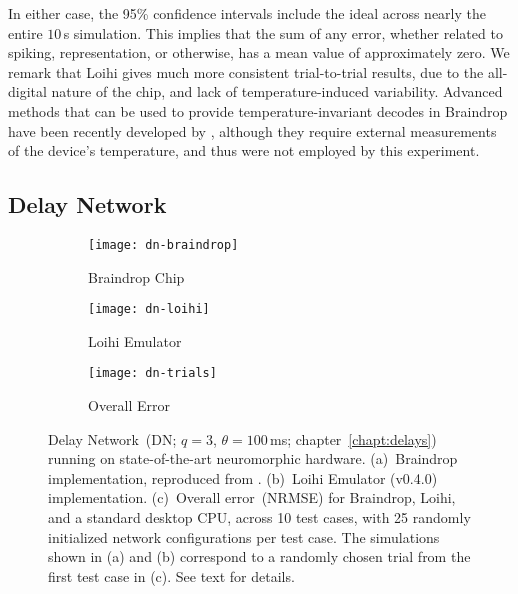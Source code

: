
In either case, the 95\% confidence intervals include the ideal across nearly the entire $10$\,s simulation.
This implies that the sum of any error, whether related to spiking, representation, or otherwise, has a mean value of approximately zero.
We remark that Loihi gives much more consistent trial-to-trial results, due to the all-digital nature of the chip, and lack of temperature-induced variability.
Advanced methods that can be used to provide temperature-invariant decodes in Braindrop have been recently developed by \citet{reidpint2019}, although they require external measurements of the device's temperature, and thus were not employed by this experiment.

\subsection{Delay Network}

\begin{figure}
  \centering
  \begin{subfigure}{.5\textwidth}
    \centering
    \texttt{[image: dn-braindrop]}
    \caption{Braindrop Chip}
    \label{fig:dn-braindrop}
  \end{subfigure}%
  \begin{subfigure}{.5\textwidth}
    \centering
    \texttt{[image: dn-loihi]}
    \caption{Loihi Emulator}
    \label{fig:dn-loihi}
  \end{subfigure}
  \begin{subfigure}{\textwidth}
    \centering
    \vspace{2em}
    \texttt{[image: dn-trials]}
    \caption{Overall Error}
    \label{fig:dn-trials}
  \end{subfigure}
  \caption{ \label{fig:dn-neuromorphic}
    Delay Network~(DN; $q=3$, $\theta=100$\,ms; chapter~\ref{chapt:delays}) running on state-of-the-art neuromorphic hardware.
    (a)~Braindrop implementation, reproduced from \citet[][Figure~16]{braindrop2019}. 
    (b)~Loihi Emulator (v0.4.0) implementation.
    (c)~Overall error~(NRMSE) for Braindrop, Loihi, and a standard desktop CPU, across 10 test cases, with 25 randomly initialized network configurations per test case.
    The simulations shown in (a) and (b) correspond to a randomly chosen trial from the first test case in (c).
    See text for details.
  }
\end{figure}


